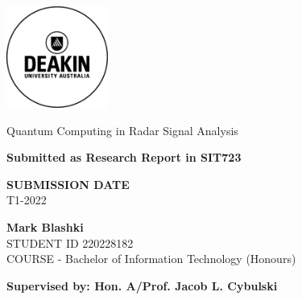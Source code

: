 \documentclass[oneside,12pt]{article}
\theoremstyle{definition}
\theoremstyle{remark}
\begin{document}
\onehalfspacing
\thispagestyle{empty} 
\begin{titlepage}
    \includegraphics[width=0.25\textwidth]{Deakin_Logo.jpeg}
    \begin{center}
       \vspace*{4cm}
       {\LARGE Quantum Computing in Radar Signal Analysis}
       \vspace{3cm}
    \begin{large}   
    
        {\bf Submitted as Research Report in SIT723}
       \vspace{1cm}
        
        {\bf SUBMISSION DATE} \\
        T1-2022
        
       \vspace{3cm}
       \textbf{Mark Blashki}\\
       STUDENT ID 220228182 \\
       COURSE - Bachelor of Information Technology (Honours)
       \vfill
       
       {\bf \normalsize Supervised by: Hon. A/Prof. Jacob L. Cybulski }\\
       
    \end{large}  
   \end{center}
\end{titlepage}

\setlength{\marginparwidth}{4cm}

\newpage 
\thispagestyle{plain} 


\newpage
\begin{singlespacing}
\tableofcontents
\end{singlespacing}
\setlength{\parskip}{1em}
\renewcommand{\baselinestretch}{2.0}

\newpage
\listoffigures
\listoftables
\end{document}
